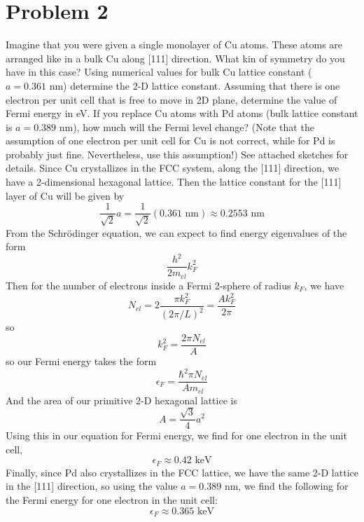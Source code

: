 \documentclass{article}
\begin{document}
\section*{Problem 2}
Imagine that you were given a single monolayer of Cu atoms. These atoms are arranged like in a bulk Cu along [111] direction. What kin of symmetry do you have in this case? Using numerical values for bulk Cu lattice constant ($a = 0.361 \text{ nm}$) determine the 2-D lattice constant. Assuming that there is one electron per unit cell that is free to move in 2D plane, determine the value of Fermi energy in eV. If you replace Cu atoms with Pd atoms (bulk lattice constant is $a = 0.389 \text{ nm}$), how much will the Fermi level change? (Note that the assumption of one electron per unit cell for Cu is not correct, while for Pd is probably just fine. Nevertheless, use this assumption!)
\newline\newline
See attached sketches for details. Since Cu crystallizes in the FCC system, along the [111] direction, we have a 2-dimensional hexagonal lattice. Then the lattice constant for the [111] layer of Cu will be given by
\[\frac{1}{\sqrt{2}}a = \frac{1}{\sqrt{2}}(0.361 \text{ nm}) \approx 0.2553 \text{ nm}\]
From the Schr\"odinger equation, we can expect to find energy eigenvalues of the form
\[\frac{h^2}{2m_{el}}k_F^2\]
Then for the number of electrons inside a Fermi 2-sphere of radius $k_F$, we have
\[N_{el} = 2\frac{\pi k_F^2}{(2\pi/L)^2} = \frac{Ak_F^2}{2\pi}\]
so
\[k_F^2 = \frac{2\pi N_{el}}{A}\]
so our Fermi energy takes the form
\[\epsilon_F = \frac{\hbar^2\pi N_{el}}{Am_{el}}\]
And the area of our primitive 2-D hexagonal lattice is 
\[A = \frac{\sqrt{3}}{4}a^2\]
Using this in our equation for Fermi energy, we find for one electron in the unit cell,
\[\epsilon_F \approx 0.42 \text{ keV}\]
Finally, since Pd also crystallizes in the FCC lattice, we have the same 2-D lattice in the [111] direction, so using the value $a = 0.389 \text{ nm}$, we find the following for the Fermi energy for one electron in the unit cell:
\[\epsilon_F \approx 0.365 \text{ keV}\]

\newpage
\end{document}
